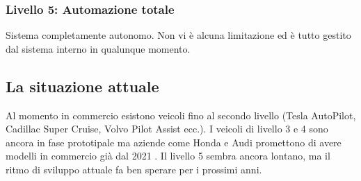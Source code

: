 \subsubsection{Livello 5: Automazione totale}
Sistema completamente autonomo. Non vi è alcuna limitazione ed è tutto gestito dal sistema interno in qualunque momento. 
\subsection{La situazione attuale}
Al momento in commercio esistono veicoli fino al secondo livello (Tesla AutoPilot, Cadillac Super Cruise, Volvo Pilot Assist ecc.). I veicoli di livello 3 e 4 sono ancora in fase prototipale
ma aziende come Honda e Audi promettono  di avere modelli in commercio già dal 2021 \cite{honda}. Il livello 5 sembra ancora lontano, ma il ritmo di sviluppo attuale fa ben sperare per i prossimi anni.
    